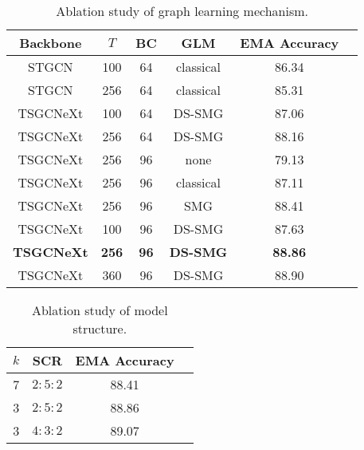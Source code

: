 \documentclass[10pt,twocolumn,letterpaper]{article}
\begin{document}
\begin{table}[htp]
  \centering
  \setlength{\abovecaptionskip}{0pt}
  \caption{Ablation study of graph learning mechanism.}
  \setlength{\belowcaptionskip}{0pt}
    \begin{tabular}{cccccc}
    \toprule Backbone & $T$ & BC & GLM &EMA Accuracy\\
    \midrule STGCN    & 100 &64     & classical & 86.34\\
    STGCN    & 256 &64     & classical & 85.31\\
TSGCNeXt &100  &64     & DS-SMG & 87.06\\
    TSGCNeXt &256  &64     & DS-SMG & 88.16\\
    \midrule
    TSGCNeXt &256  &96     & none   & 79.13\\
    TSGCNeXt &256  &96     & classical & 87.11\\
    TSGCNeXt &256  &96     & SMG    & 88.41\\
    \midrule
    TSGCNeXt &100  &96     & DS-SMG & 87.63\\
    \textbf{TSGCNeXt} &\textbf{256}  &\textbf{96 }    & \textbf{DS-SMG} &  \textbf{88.86}\\
    TSGCNeXt &360  &96     & DS-SMG & 88.90\\
    \bottomrule \end{tabular}\label{tab:Ablation Study2}\vspace{-1em}
\end{table}\begin{table}[htp]
  \centering
  \caption{Ablation study of model structure.}
    \begin{tabular}{cccc}
    \toprule $k$ & SCR &EMA Accuracy\\
    \midrule 7         & $2:5:2$ & 88.41\\
    3         & $2:5:2$ & 88.86\\
    3         & $4:3:2$ & 89.07\\
    \bottomrule \end{tabular}\label{tab:Ablation Studyl}\vspace{-1em}
\end{table}
\end{document}
